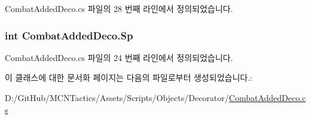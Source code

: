 Combat\+Added\+Deco.\+cs 파일의 28 번째 라인에서 정의되었습니다.

\subsubsection[{\texorpdfstring{Sp}{Sp}}]{\setlength{\rightskip}{0pt plus 5cm}int Combat\+Added\+Deco.\+Sp\hspace{0.3cm}{\ttfamily [get]}}\hypertarget{class_combat_added_deco_aac41784d0f685c5db6107affca78d089}{}\label{class_combat_added_deco_aac41784d0f685c5db6107affca78d089}


Combat\+Added\+Deco.\+cs 파일의 24 번째 라인에서 정의되었습니다.



이 클래스에 대한 문서화 페이지는 다음의 파일로부터 생성되었습니다.\+:\begin{DoxyCompactItemize}
\item 
D\+:/\+Git\+Hub/\+M\+C\+N\+Tactics/\+Assets/\+Scripts/\+Objects/\+Decorator/\hyperlink{_combat_added_deco_8cs}{Combat\+Added\+Deco.\+cs}\end{DoxyCompactItemize}
